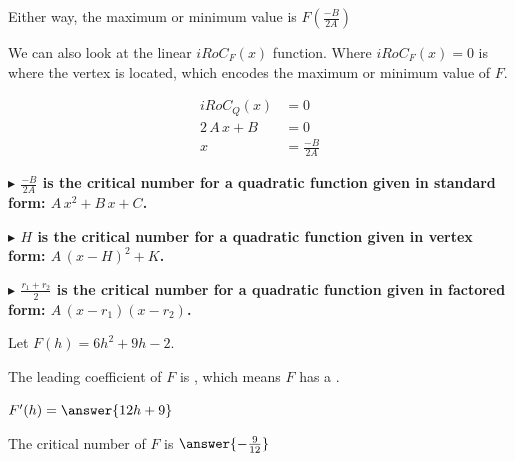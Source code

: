 \documentclass{ximera}
\begin{document}
Either way, the maximum or minimum value is $F\left( \frac{-B}{2A} \right)$




We can also look at the linear $iRoC_F(x)$ function.  Where $iRoC_F(x) = 0$ is where the vertex is located, which encodes the maximum or minimum value of $F$.





\begin{align*}
iRoC_Q(x)       &= 0  \\
2 \, A \, x + B  & = 0  \\
x     &=  \frac{-B}{2A}
\end{align*}




\textbf{\textcolor{blue!55!black}{$\blacktriangleright$ $\frac{-B}{2A}$ is the critical number for a quadratic function given in standard form: $A \, x^2 + B \, x + C$.}}  



\textbf{\textcolor{blue!55!black}{$\blacktriangleright$ $H$ is the critical number for a quadratic function given in vertex form: $A \, (x - H)^2 + K$.}}  



\textbf{\textcolor{blue!55!black}{$\blacktriangleright$ $\frac{r_1 + r_2}{2}$ is the critical number for a quadratic function given in factored form: $A \, (x - r_1) (x - r_2)$.}}  














\begin{question} 


Let $F(h) = 6 h^2 + 9 h - 2$.



The leading coefficient of $F$ is , which means $F$ has a .



$F'(h) = \answer{12h+9}$



The critical number of $F$ is $\answer{-\frac{9}{12}}$



\end{question}
\end{document}
